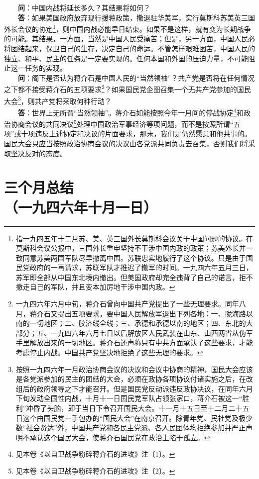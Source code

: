 \documentclass[cn,11pt,chinese]{elegantbook}
\def\myformat#1{\hfil\hfil #1}
\begin{document}
　　\textbf{问}：中国内战将延长多久？其结果将如何？\\
　　\textbf{答}：如果美国政府放弃现行援蒋政策，撤退驻华美军，实行莫斯科苏美英三国外长会议的协定\footnote[2]{ 指一九四五年十二月苏、美、英三国外长莫斯科会议关于中国问题的协议。在莫斯科会议公报中，三国外长重申坚持不干涉中国内政的政策；苏美外长并一致同意苏美两国军队尽早撤离中国。苏联忠实地履行了这个协议。只是由于国民党政府的一再请求，苏联军队才推迟了撤军的时间。一九四六年五月三日，苏军即全部从中国东北境内撤出。但美国政府却完全违背了自己的诺言，拒不撤走自己的军队，并且变本加厉地干涉中国内政。}，则中国内战必能早日结束。如果不是这样，就有变为长期战争的可能。其结果，一方面，当然是中国人民受痛苦；但是，另一方面，中国人民必将团结起来，保卫自己的生存，决定自己的命运。不管怎样艰难困苦，中国人民的独立、和平、民主的任务是一定要实现的。任何本国和外国的压迫力量，不可能阻止这一任务的实现。\\
　　\textbf{问}：阁下是否认为蒋介石是中国人民的“当然领袖”？共产党是否将在任何情况之下都不接受蒋介石的五项要求\footnote[3]{ 一九四六年六月中旬，蒋介石曾向中国共产党提出了一些无理要求。同年八月，蒋介石又提出五项要求，要中国人民解放军退出下列各地：一、陇海路以南的一切地区；二、胶济线全线；三、承德和承德以南的地区；四、东北的大部分；五、一九四六年六月七日以后解放区人民武装在山东、山西两省从伪军手里解放出来的一切地区。蒋介石还声称只有中共方面承认了这些要求，才能考虑停止内战。中国共产党坚决地拒绝了这些无理的要求。}？如果国民党企图召集一个无共产党参加的国民大会\footnote[4]{ 按照一九四六年一月政治协商会议的决议和会议中协商的精神，国民大会应该是各党派参加的民主的团结的大会，必须在政协各项协议付诸实施之后，在改组后的政府领导之下才能召开。但是国民党反动派违反政协决议，在同年六月下旬发动全国性内战，十月十一日国民党军队占领张家口，蒋介石被这一“胜利”冲昏了头脑，即于当日下令召开国民大会。十一月十五日至十二月二十五日这个由国民党一手包办的“国民大会”在南京召开。除青年党、民社党及极少数“社会贤达”外，中国共产党和各民主党派、各人民团体均拒绝参加并严正声明不承认这个国民大会，使蒋介石国民党在政治上陷于孤立。}，则共产党将采取何种行动？\\
　　\textbf{答}：世界上无所谓“当然领袖”。蒋介石如能按照今年一月间的停战协定\footnote[5]{ 见本卷《以自卫战争粉碎蒋介石的进攻》注〔1〕。}和政治协商会议的共同决议\footnote[6]{ 见本卷《以自卫战争粉碎蒋介石的进攻》注〔2〕。}处理中国政治军事经济等项问题，而不是按照所谓“五项”或十项违反上述协定和决议的片面要求，那末，我们是仍然愿意和他共事的。国民大会只应当按照政治协商会议的决议由各党派共同负责去召集，否则我们将采取坚决反对的态度。\\
\newpage\section*{\myformat{三个月总结}\\\myformat{（一九四六年十月一日）}}
\end{document}
